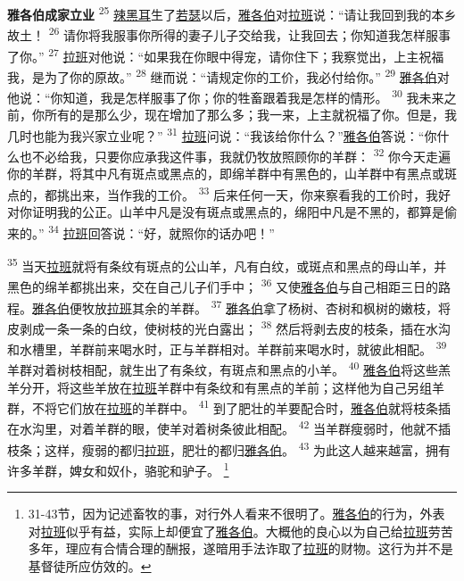 \textbf{雅各伯成家立业 }
\textsuperscript{25}
\uline{辣黑耳}生了\uline{若瑟}以后，\uline{雅各伯}对\uline{拉班}说：“请让我回到我的本乡故土！
\textsuperscript{26}
请你将我服事你所得的妻子儿子交给我，让我回去；你知道我怎样服事了你。”
\textsuperscript{27}
\uline{拉班}对他说：“如果我在你眼中得宠，请你住下；我察觉出，上主祝福我，是为了你的原故。”
\textsuperscript{28}
继而说：“请规定你的工价，我必付给你。”
\textsuperscript{29}
\uline{雅各伯}对他说：“你知道，我是怎样服事了你；你的牲畜跟着我是怎样的情形。
\textsuperscript{30}
我未来之前，你所有的是那么少，现在增加了那么多；我一来，上主就祝福了你。但是，我几时也能为我兴家立业呢？”
\textsuperscript{31}
\uline{拉班}问说：“我该给你什么？”\uline{雅各伯}答说：“你什么也不必给我，只要你应承我这件事，我就仍牧放照顾你的羊群：
\textsuperscript{32}
你今天走遍你的羊群，将其中凡有斑点或黑点的，即绵羊群中有黑色的，山羊群中有黑点或斑点的，都挑出来，当作我的工价。
\textsuperscript{33}
后来任何一天，你来察看我的工价时，我好对你证明我的公正。山羊中凡是没有斑点或黑点的，绵阳中凡是不黑的，都算是偷来的。”
\textsuperscript{34}
\uline{拉班}回答说：“好，就照你的话办吧！”

\textsuperscript{35}
当天\uline{拉班}就将有条纹有斑点的公山羊，凡有白纹，或斑点和黑点的母山羊，并黑色的绵羊都挑出来，交在自己儿子们手中；
\textsuperscript{36}
又使\uline{雅各伯}与自己相距三日的路程。\uline{雅各伯}便牧放\uline{拉班}其余的羊群。
\textsuperscript{37}
\uline{雅各伯}拿了杨树、杏树和枫树的嫩枝，将皮剥成一条一条的白纹，使树枝的光白露出；
\textsuperscript{38}
然后将剥去皮的枝条，插在水沟和水槽里，羊群前来喝水时，正与羊群相对。羊群前来喝水时，就彼此相配。
\textsuperscript{39}
羊群对着树枝相配，就生出了有条纹，有斑点和黑点的小羊。
\textsuperscript{40}
\uline{雅各伯}将这些羔羊分开，将这些羊放在\uline{拉班}羊群中有条纹和有黑点的羊前；这样他为自己另组羊群，不将它们放在\uline{拉班}的羊群中。
\textsuperscript{41}
到了肥壮的羊要配合时，\uline{雅各伯}就将枝条插在水沟里，对着羊群的眼，使羊对着树条彼此相配。
\textsuperscript{42}
当羊群瘦弱时，他就不插枝条；这样，瘦弱的都归\uline{拉班}，肥壮的都归\uline{雅各伯}。
\textsuperscript{43}
为此这人越来越富，拥有许多羊群，婢女和奴仆，骆驼和驴子。
\footnote{31-43节，因为记述畜牧的事，对行外人看来不很明了。\uline{雅各伯}的行为，外表对\uline{拉班}似乎有益，实际上却便宜了\uline{雅各伯}。大概他的良心以为自己给\uline{拉班}劳苦多年，理应有合情合理的酬报，遂暗用手法诈取了\uline{拉班}的财物。这行为并不是基督徒所应仿效的。}

